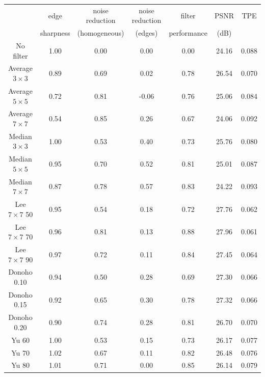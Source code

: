 \documentclass[12pt]{report}
\renewcommand{\baselinestretch}{1.5}
\begin{document}
\begin{table}[p]
\setlength{\abovecaptionskip}{-0.25cm}
\renewcommand{\baselinestretch}{1.0}
\begin{center}
\begin{scriptsize}
\begin{tabular}{|c|c|c|c|c|c|c|} \hline
			& edge		& noise reduction & noise reduction 	& filter& PSNR 		& TPE	\\
			& sharpness	& (homogeneous)	  & (edges)		& performance & (dB)	&	\\ \hline \hline

No filter		& 1.00	& 0.00		& 0.00		& 0.00	& 24.16		& 0.088		\\ \hline \hline

Average $3 \times 3$	& 0.89	& 0.69		& 0.02		& 0.78	& 26.54		& 0.070		\\ \hline
Average $5 \times 5$	& 0.72	& 0.81		& -0.06		& 0.76	& 25.06		& 0.084		\\ \hline
Average $7 \times 7$	& 0.54	& 0.85		& 0.26		& 0.67	& 24.06		& 0.092		\\ \hline \hline	 

Median $3 \times 3$	& 1.00	& 0.53		& 0.40		& 0.73	& 25.76		& 0.080		\\ \hline
Median $5 \times 5$	& 0.95	& 0.70		& 0.52		& 0.81	& 25.01		& 0.087		\\ \hline	
Median $7 \times 7$	& 0.87	& 0.78		& 0.57		& 0.83	& 24.22		& 0.093		\\ \hline \hline

Lee $7 \times 7$ 50	& 0.95	& 0.54		& 0.18		& 0.72	& 27.76		& 0.062		\\ \hline
Lee $7 \times 7$ 70	& 0.96	& 0.81		& 0.13		& 0.88	& 27.96		& 0.061		\\ \hline
Lee $7 \times 7$ 90	& 0.97	& 0.72		& 0.11		& 0.84	& 27.45		& 0.064		\\ \hline \hline		

Donoho 0.10		& 0.94	& 0.50		& 0.28		& 0.69	& 27.30		& 0.066		\\ \hline
Donoho 0.15		& 0.92	& 0.65		& 0.30		& 0.78	& 27.32		& 0.066		\\ \hline
Donoho 0.20		& 0.90	& 0.74		& 0.28		& 0.81	& 26.70		& 0.070		\\ \hline \hline

Yu 60			& 1.00  & 0.53		& 0.15		& 0.73	& 26.17		& 0.077		\\ \hline
Yu 70			& 1.02	& 0.67		& 0.11		& 0.82	& 26.48		& 0.076		\\ \hline
Yu 80			& 1.01	& 0.71		& 0.00		& 0.85	& 26.14		& 0.079		\\ \hline \hline 


\end{tabular}
\end{scriptsize}
\end{center}
\end{table}
\end{document}
